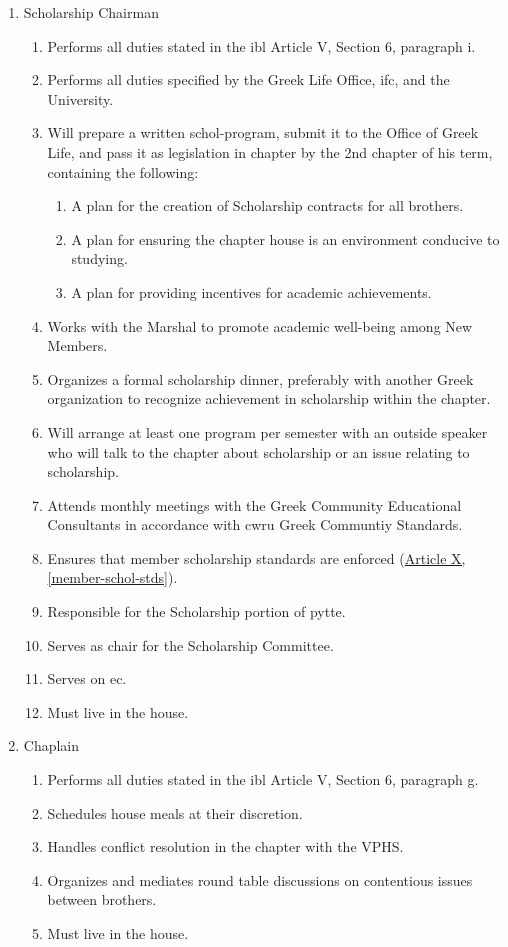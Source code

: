\begin{enumerate}
		\item Scholarship Chairman \label{schol-chair-duties}
			\begin{enumerate}
				\item Performs all duties stated in the \gls{ibl} Article V, Section 6, paragraph i.
				\item Performs all duties specified by the Greek Life Office, \gls{ifc}, and the University.
				\item Will prepare a written \gls{schol-program}, submit it to the Office of Greek Life, and pass it as legislation in chapter by the 2nd chapter of his term, containing the following:
				\begin{enumerate}
					\item A plan for the creation of Scholarship contracts for all brothers.
					\item A plan for ensuring the chapter house is an environment conducive to studying.
					\item A plan for providing incentives for academic achievements.
				\end{enumerate}
				\item Works with the Marshal to promote academic well-being among New Members.
                \item Organizes a formal scholarship dinner, preferably with another Greek organization to recognize achievement in scholarship within the chapter.
				\item Will arrange at least one program per semester with an outside speaker who will talk to the chapter about scholarship or an issue relating to scholarship.
				\item Attends monthly meetings with the Greek Community Educational Consultants in accordance with \gls{cwru} Greek Communtiy Standards.
				\item Ensures that member scholarship standards are enforced (\hyperref[member-schol-stds]{Article X, \autoref*{member-schol-stds}}).
				\item Responsible for the Scholarship portion of \gls{pytte}.
                \item Serves as chair for the Scholarship Committee.
                \item Serves on \gls{ec}.
                \item Must live in the house.
			\end{enumerate}
	

		\item Chaplain
			\begin{enumerate}
				\item Performs all duties stated in the \gls{ibl} Article V, Section 6, paragraph g.
				\item Schedules house meals at their discretion.
				\item Handles conflict resolution in the chapter with the VPHS.
				\item Organizes and mediates round table discussions on contentious issues between brothers.
				\item Must live in the house.
			\end{enumerate}


\end{enumerate}
